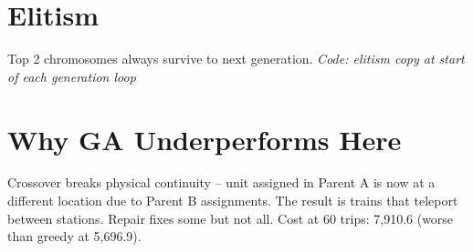 \documentclass{article}
\begin{document}
\section{Elitism}
Top 2 chromosomes always survive to next generation.
\textit{Code: elitism copy at start of each generation loop}

\section{Why GA Underperforms Here}
Crossover breaks physical continuity -- unit assigned in Parent A is now
at a different location due to Parent B assignments. The result is
trains that teleport between stations. Repair fixes some but not all.
Cost at 60 trips: 7,910.6 (worse than greedy at 5,696.9).
\end{document}
